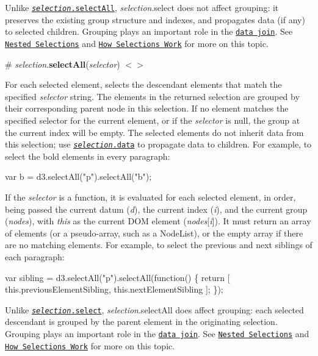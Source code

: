 Unlike \href{#selection_selectAll}{\tt {\itshape selection}.select\+All}, {\itshape selection}.select does not affect grouping\+: it preserves the existing group structure and indexes, and propagates data (if any) to selected children. Grouping plays an important role in the \href{#joining-data}{\tt data join}. See \href{http://bost.ocks.org/mike/nest/}{\tt Nested Selections} and \href{http://bost.ocks.org/mike/selection/}{\tt How Selections Work} for more on this topic.

\label{_selection_selectAll}%
\# {\itshape selection}.{\bfseries select\+All}({\itshape selector}) \href{https://github.com/d3/d3-selection/blob/master/src/selection/selectAll.js}{\tt $<$$>$}

For each selected element, selects the descendant elements that match the specified {\itshape selector} string. The elements in the returned selection are grouped by their corresponding parent node in this selection. If no element matches the specified selector for the current element, or if the {\itshape selector} is null, the group at the current index will be empty. The selected elements do not inherit data from this selection; use \href{#selection_data}{\tt {\itshape selection}.data} to propagate data to children. For example, to select the bold elements in every paragraph\+:


\begin{DoxyCode}
var b = d3.selectAll("p").selectAll("b");
\end{DoxyCode}


If the {\itshape selector} is a function, it is evaluated for each selected element, in order, being passed the current datum ({\itshape d}), the current index ({\itshape i}), and the current group ({\itshape nodes}), with {\itshape this} as the current D\+OM element ({\itshape nodes}\mbox{[}{\itshape i}\mbox{]}). It must return an array of elements (or a pseudo-\/array, such as a Node\+List), or the empty array if there are no matching elements. For example, to select the previous and next siblings of each paragraph\+:


\begin{DoxyCode}
var sibling = d3.selectAll("p").selectAll(function() \{
  return [
    this.previousElementSibling,
    this.nextElementSibling
  ];
\});
\end{DoxyCode}


Unlike \href{#selection_select}{\tt {\itshape selection}.select}, {\itshape selection}.select\+All does affect grouping\+: each selected descendant is grouped by the parent element in the originating selection. Grouping plays an important role in the \href{#joining-data}{\tt data join}. See \href{http://bost.ocks.org/mike/nest/}{\tt Nested Selections} and \href{http://bost.ocks.org/mike/selection/}{\tt How Selections Work} for more on this topic.

